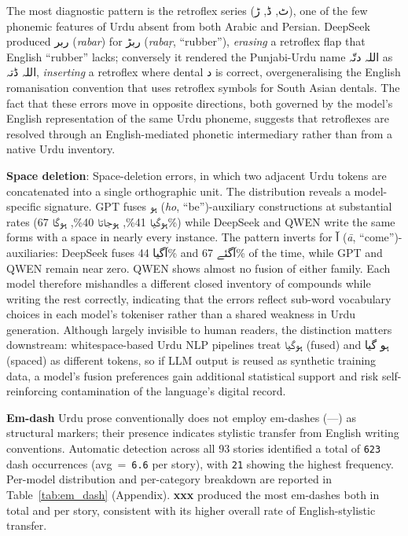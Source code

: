 \documentclass[11pt]{article}
\begin{document}
The most diagnostic pattern is the retroflex series
(\foreignlanguage{arabic}{ٹ},
\foreignlanguage{arabic}{ڈ},
\foreignlanguage{arabic}{ڑ}), one of the few phonemic
features of Urdu absent from both Arabic and Persian.
DeepSeek produced \foreignlanguage{arabic}{ربر}
(\textit{rabar}) for \foreignlanguage{arabic}{ربڑ}
(\textit{rabaṛ}, ``rubber''), \emph{erasing} a retroflex
flap that English ``rubber'' lacks; conversely it
rendered the Punjabi-Urdu name
\foreignlanguage{arabic}{اللہ دتّہ} as
\foreignlanguage{arabic}{اللہ ڈتہ}, \emph{inserting} a
retroflex where dental \foreignlanguage{arabic}{د} is
correct, overgeneralising the English romanisation
convention that uses retroflex symbols for South Asian
dentals. The fact that these errors move in opposite
directions, both governed by the model's English
representation of the same Urdu phoneme, suggests that
retroflexes are resolved through an English-mediated
phonetic intermediary rather than from a native Urdu
inventory.

\textbf{Space deletion}: Space-deletion errors, in which
two adjacent Urdu tokens are concatenated into a single
orthographic unit. The distribution reveals a model-specific
signature. GPT fuses
\foreignlanguage{arabic}{ہو} (\textit{ho},
``be'')-auxiliary constructions at substantial rates
(\foreignlanguage{arabic}{ہوگیا} 41\%,
\foreignlanguage{arabic}{ہوجاتا} 40\%,
\foreignlanguage{arabic}{ہوگا} 67\%) while DeepSeek and
QWEN write the same forms with a space in nearly every
instance. The pattern inverts for
\foreignlanguage{arabic}{آ} (\textit{ā},
``come'')-auxiliaries: DeepSeek fuses
\foreignlanguage{arabic}{آگیا} 44\% and
\foreignlanguage{arabic}{آگئے} 67\% of the time, while
GPT and QWEN remain near zero. QWEN shows almost no
fusion of either family. Each model therefore mishandles
a different closed inventory of compounds while writing
the rest correctly, indicating that the errors reflect
sub-word vocabulary choices in each model's tokeniser
rather than a shared weakness in Urdu generation.
Although largely invisible to human readers, the
distinction matters downstream: whitespace-based Urdu
NLP pipelines treat \foreignlanguage{arabic}{ہوگیا}
(fused) and \foreignlanguage{arabic}{ہو گیا} (spaced) as
different tokens, so if LLM output is reused as
synthetic training data, a model's fusion preferences
gain additional statistical support and risk
self-reinforcing contamination of the language's digital
record.

\textbf{Em-dash} \label{subsec:auto_errors} Urdu prose 
conventionally does not employ em-dashes (---) 
as structural markers; their 
presence indicates stylistic transfer from 
English writing conventions. Automatic 
detection across all 93 stories identified 
a total of \texttt{623} dash occurrences 
(avg~=~\texttt{6.6} per story), with 
\texttt{21} showing the highest frequency.
Per-model
distribution and per-category breakdown are reported
in Table~\ref{tab:em_dash} (Appendix).
\textbf{xxx} produced the most em-dashes both in
total and per story, consistent with its higher
overall rate of English-stylistic transfer.
\end{document}
